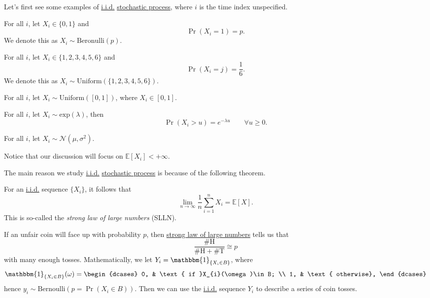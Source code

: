 Let's first see some examples of \hyperref[def:i.i.d.]{i.i.d.} \hyperref[def:stochastic-process]{stochastic process}, where \(i\) is the time index unspecified.
\begin{eg}
	For all \(i\), let \(X_{i}\in\{0, 1\}\) and
	\[
		\Pr(X_{i} = 1) = p.
	\]
	We denote this as \(X_i\sim \mathrm{Beronulli}(p)\).
\end{eg}

\begin{eg}
	For all \(i\), let \(X_{i}\in\{1, 2, 3, 4, 5, 6\}\) and
	\[
		\Pr(X_{i} = j) = \frac{1}{6}.
	\]
	We denote this as \(X_i\sim \mathrm{Uniform}(\{1, 2, 3, 4, 5, 6\})\).
\end{eg}

\begin{eg}
	For all \(i\), let \(X_i\sim \mathrm{Uniform}(\left[ 0, 1 \right] )\), where \(X_{i}\in\left[ 0, 1 \right] \).
\end{eg}

\begin{eg}
	For all \(i\), let \(X_i\sim \mathrm{exp}(\lambda)\), then
	\[
		\Pr(X_{i}>u) = e^{-\lambda u}\qquad \forall u\geq 0.
	\]
\end{eg}

\begin{eg}
	For all \(i\), let \(X_i\sim \mathcal{N}(\mu, \sigma^2)\).
\end{eg}

\begin{remark}
	Notice that our discussion will focus on \(\mathbb{E}\left[X_i \right] < +\infty \).
\end{remark}

The main reason we study \hyperref[def:i.i.d.]{i.i.d.} \hyperref[def:stochastic-process]{stochastic process} is because of the following theorem.
\begin{theorem}\label{thm:SLLN}
	For an \hyperref[def:i.i.d.]{i.i.d.} sequence \(\{X_i\}\), it follows that
	\[
		\lim_{n \to \infty} \frac{1}{n}\sum\limits_{i=1}^{n} X_{i} = \mathbb{E}\left[X \right].
	\]
	This is so-called the \emph{strong law of large numbers} (SLLN).
\end{theorem}

\begin{eg}
	If an unfair coin will face up with probability \(p\), then \hyperref[thm:SLLN]{strong law of large numbers} tells us that
	\[
		\frac{\# \mathrm{H} }{\# \mathrm{H} + \# \mathrm{T} } \cong p
	\]
	with many enough tosses. Mathematically, we let \(Y_{i} = \mathbbm{1}_{\{X_{i}\in B\}}\), where
	\[
		\mathbbm{1}_{\{X_{i}\in B\}}(\omega) = \begin{dcases}
			0, & \text{ if }X_{i}(\omega)\in B; \\
			1, & \text{ otherwise},
		\end{dcases}
	\]
	hence \(y_{i}\sim \mathrm{Bernoulli}(p = \Pr(X_{i}\in B))\). Then we can use the \hyperref[def:i.i.d.]{i.i.d.} sequence \(Y_i\) to
	describe a series of coin tosses.
\end{eg}

